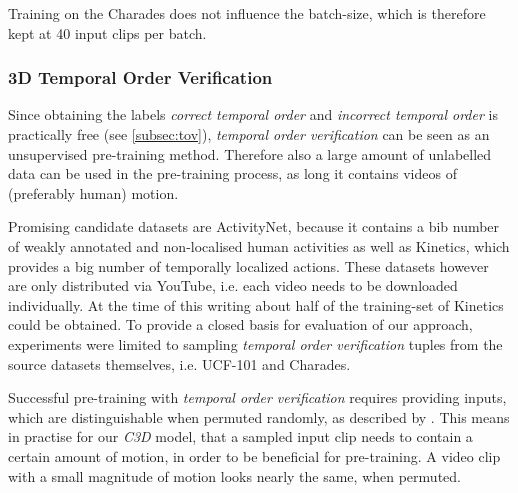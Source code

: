Training on the Charades does not influence the batch-size, which is therefore kept at 40 input clips per batch.

\subsubsection{3D Temporal Order Verification}
Since obtaining the labels \textit{correct temporal order} and \textit{incorrect temporal order} is practically free (see \ref{subsec:tov}), \textit{temporal order verification} can be seen as an unsupervised pre-training method.
Therefore also a large amount of unlabelled data can be used in the pre-training process, as long it contains videos of (preferably human) motion.

Promising candidate datasets are ActivityNet, because it contains a bib number of weakly annotated and non-localised human activities as well as Kinetics, which provides a big number of temporally localized actions.
These datasets however are only distributed via YouTube, i.e. each video needs to be downloaded individually.
At the time of this writing about half of the training-set of Kinetics could be obtained.
To provide a closed basis for evaluation of our approach, experiments were limited to sampling \textit{temporal order verification} tuples from the source datasets themselves, i.e. UCF-101 and Charades.

Successful pre-training with \textit{temporal order verification} requires providing inputs, which are distinguishable when permuted randomly, as described by \textcite{misra_shuffle_2016}.
This means in practise for our \textit{C3D} model, that a sampled input clip needs to contain a certain amount of motion, in order to be beneficial for pre-training.
A video clip with a small magnitude of motion looks nearly the same, when permuted.


